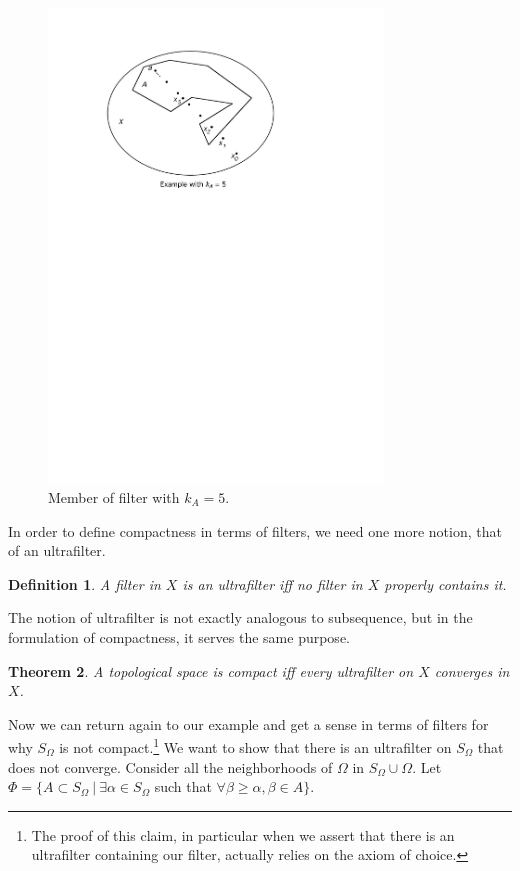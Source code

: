 \documentclass[12pt]{article}
\newtheorem{thm}{Theorem}[section]
\newtheorem{dfn}[thm]{Definition}
\begin{document}
\begin{figure}[h]
\label{fig7}
  \begin{center}
   \includegraphics[width=3.5in]{filter.pdf}
  \end{center}
  \caption{Member of filter with $k_A = 5$.}
  \end{figure}

In order to define compactness in terms of filters, we need one more notion, that of
an ultrafilter.

\begin{dfn}
A filter in $X$ is an {\em ultrafilter} iff no filter in $X$ properly contains it. 
\end{dfn}

The notion of ultrafilter is not exactly analogous to subsequence, but in the
formulation of compactness, it serves the same purpose.

\begin{thm}
 A topological space is {\em compact} iff every ultrafilter on  $X$ converges
in $X$.
\end{thm}

Now we can return again to our example and get a sense in terms of filters for why  
$S_\Omega$ is not compact.\footnote{The proof of this claim, in particular when we
assert that there is an ultrafilter containing our filter, actually relies on the
axiom of choice.}  We want to show that there is an ultrafilter on $S_\Omega$  that
does not converge. Consider all the neighborhoods of $\Omega$  in  $S_\Omega \cup
\Omega$. Let $\Phi=\{A \subset S_\Omega \:|\: \exists \alpha \in S_\Omega$ such that
$\forall \beta \geq \alpha, \beta \in A\}$.  
\end{document}
